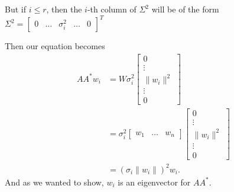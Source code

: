 \documentclass{article}
\begin{document}
\begin{enumerate}
    But if $i\leq r$, then the $i$-th column of $\Sigma^2$ will be of the form $\Sigma^2=\begin{bmatrix} 0& \dots& \sigma_i^2& \dots & 0 \end{bmatrix}^{T}$ 

    Then our equation becomes
    \begin{align*}
        A A^* w_i&=  W\sigma_i^2\begin{bmatrix} 0\\ \vdots\\ \|w_i\|^2\\ \vdots \\ 0 \end{bmatrix}\\
        &=  \sigma_i^2\begin{bmatrix} w_1&\dots&w_n \end{bmatrix}\begin{bmatrix} 0\\ \vdots\\ \|w_i\|^2\\ \vdots \\ 0 \end{bmatrix}\\
        &= (\sigma_i\|w_i\|)^2w_i 
    .\end{align*}
    And as we wanted to show, $w_i$ is an eigenvector for $A A^* $.
\end{enumerate}
\end{document}
